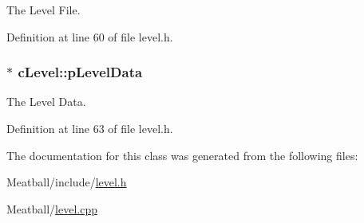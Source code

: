 The Level File. 



Definition at line 60 of file level.\-h.

\hypertarget{classc_level_ac1e503ae5528aa38c198671cf26ae6c3}{
\subsubsection[{p\-Level\-Data}]{$\ast$ c\-Level\-::p\-Level\-Data}}\label{classc_level_ac1e503ae5528aa38c198671cf26ae6c3}


The Level Data. 



Definition at line 63 of file level.\-h.



The documentation for this class was generated from the following files\-:\begin{DoxyCompactItemize}
\item 
Meatball/include/\hyperlink{level_8h}{level.\-h}\item 
Meatball/\hyperlink{level_8cpp}{level.\-cpp}\end{DoxyCompactItemize}
